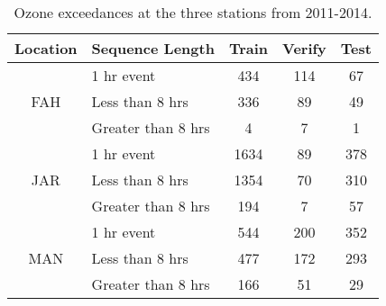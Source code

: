 \begin{table}[]
\centering
\caption{Ozone exceedances at the three stations from 2011-2014.}
\label{tab:exceedance_eventsl}
\begin{tabular}{clccc}
\toprule
\multicolumn{1}{l}{\textbf{Location}} & \textbf{Sequence Length} & \textbf{Train} & \textbf{Verify} & \textbf{Test} \\ \hline
\multirow{3}{*}{FAH} & 1 hr event & 434 & 114 & 67 \\
 & Less than 8 hrs & 336 & 89 & 49 \\
 & Greater than 8 hrs & 4 & 7 & 1 \\ \hline
\multirow{3}{*}{JAR} & 1 hr event & 1634 & 89 & 378 \\
 & Less than 8 hrs & 1354 & 70 & 310 \\
 & Greater than 8 hrs & 194 & 7 & 57 \\ \hline
\multirow{3}{*}{MAN} & 1 hr event & 544 & 200 & 352 \\
 & Less than 8 hrs & 477 & 172 & 293 \\
 & Greater than 8 hrs & 166 & 51 & 29 \\ \hline

\end{tabular}
\end{table}